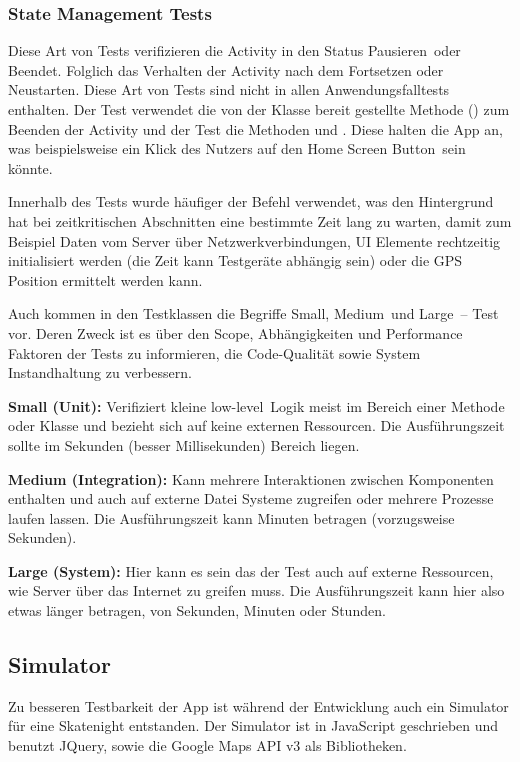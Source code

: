 \subsubsection*{State Management Tests}
Diese Art von Tests verifizieren die Activity in den Status \glqq Pausieren\grqq\ oder \glqq Beendet\grqq. Folglich das Verhalten der Activity nach dem Fortsetzen oder Neustarten. Diese Art von Tests sind nicht in allen Anwendungsfalltests enthalten.
Der Test  verwendet die von der Klasse  bereit gestellte Methode  () zum Beenden der Activity und der Test  die Methoden  und . Diese halten die App an, was beispielsweise ein Klick des Nutzers auf den \glqq Home Screen Button\grqq\ sein könnte.

Innerhalb des Tests wurde häufiger der Befehl  verwendet, was den Hintergrund hat bei zeitkritischen Abschnitten eine bestimmte Zeit lang zu warten, damit zum Beispiel Daten vom Server über Netzwerkverbindungen, UI Elemente rechtzeitig initialisiert werden (die Zeit kann Testgeräte abhängig sein) oder die GPS Position ermittelt werden kann.

Auch kommen in den Testklassen die Begriffe \glqq Small\grqq, \glqq Medium\grqq\ und \glqq Large\grqq\ – Test vor. Deren Zweck ist es über den \glqq Scope\grqq, Abhängigkeiten und Performance Faktoren der Tests zu informieren, die Code-Qualität sowie System Instandhaltung zu verbessern.

\textbf{Small (Unit):} Verifiziert kleine \glqq low-level\grqq\ Logik meist im Bereich einer Methode oder Klasse und bezieht sich auf keine externen Ressourcen. Die Ausführungszeit sollte im Sekunden (besser Millisekunden) Bereich liegen.

\textbf{Medium (Integration):} Kann mehrere Interaktionen zwischen Komponenten enthalten und auch auf externe Datei Systeme zugreifen oder mehrere Prozesse laufen lassen. Die Ausführungszeit kann Minuten betragen (vorzugsweise Sekunden).

\textbf{Large (System):} Hier kann es sein das der Test auch auf externe Ressourcen, wie Server über das Internet zu greifen muss. Die Ausführungszeit kann hier also etwas länger betragen, von Sekunden, Minuten oder Stunden.

\subsection{Simulator}
Zu besseren Testbarkeit der App ist während der Entwicklung auch ein Simulator für eine Skatenight entstanden. Der Simulator ist in JavaScript geschrieben und benutzt JQuery, sowie die Google Maps API v3 als Bibliotheken.

